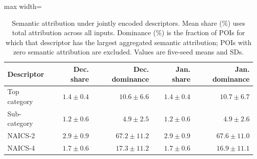 \begin{table}[!htbp]
\centering
\begingroup
\singlespacing
\fontsize{9pt}{10.5pt}\selectfont
\setlength{\tabcolsep}{4pt}
\renewcommand{\arraystretch}{1.08}
\caption{Semantic attribution under jointly encoded descriptors. Mean share (\%) uses total attribution across all inputs. Dominance (\%) is the fraction of POIs for which that descriptor has the largest aggregated semantic attribution; POIs with zero semantic attribution are excluded. Values are five-seed means and SDs.}
\label{tab:semantic_granularity}
\begin{adjustbox}{max width=\linewidth}
\begin{tabular}{lrrrr}
\toprule
Descriptor & Dec. share & Dec. dominance & Jan. share & Jan. dominance \\
\midrule
Top category & $1.4\pm 0.4$ & $10.6\pm 6.6$ & $1.4\pm 0.4$ & $10.7\pm 6.7$ \\
Sub-category & $1.2\pm 0.6$ & $4.9\pm 2.5$ & $1.2\pm 0.6$ & $4.9\pm 2.6$ \\
NAICS-2 & $2.9\pm 0.9$ & $67.2\pm 11.2$ & $2.9\pm 0.9$ & $67.6\pm 11.0$ \\
NAICS-4 & $1.7\pm 0.6$ & $17.3\pm 11.2$ & $1.7\pm 0.6$ & $16.9\pm 11.1$ \\
\bottomrule
\end{tabular}
\end{adjustbox}
\endgroup
\end{table}
